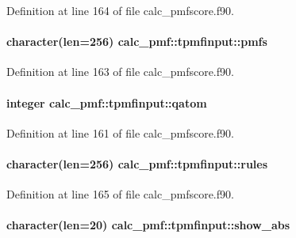 Definition at line 164 of file calc\-\_\-pmfscore.\-f90.

\hypertarget{structcalc__pmf_1_1tpmfinput_a546df7edfc9dfe583c92c0fe3f3e1081}{
\paragraph[{pmfs}]{\setlength{\rightskip}{0pt plus 5cm}character(len=256) calc\-\_\-pmf\-::tpmfinput\-::pmfs}}\label{structcalc__pmf_1_1tpmfinput_a546df7edfc9dfe583c92c0fe3f3e1081}


Definition at line 163 of file calc\-\_\-pmfscore.\-f90.

\hypertarget{structcalc__pmf_1_1tpmfinput_a4ba14d72424ce79ccca496b86afb5c06}{
\paragraph[{qatom}]{\setlength{\rightskip}{0pt plus 5cm}integer calc\-\_\-pmf\-::tpmfinput\-::qatom}}\label{structcalc__pmf_1_1tpmfinput_a4ba14d72424ce79ccca496b86afb5c06}


Definition at line 161 of file calc\-\_\-pmfscore.\-f90.

\hypertarget{structcalc__pmf_1_1tpmfinput_abf2083ff474fedb94c80061cc17aeac9}{
\paragraph[{rules}]{\setlength{\rightskip}{0pt plus 5cm}character(len=256) calc\-\_\-pmf\-::tpmfinput\-::rules}}\label{structcalc__pmf_1_1tpmfinput_abf2083ff474fedb94c80061cc17aeac9}


Definition at line 165 of file calc\-\_\-pmfscore.\-f90.

\hypertarget{structcalc__pmf_1_1tpmfinput_abea97c28c457a9014db464ac2c82e9bd}{
\paragraph[{show\-\_\-abs}]{\setlength{\rightskip}{0pt plus 5cm}character(len=20) calc\-\_\-pmf\-::tpmfinput\-::show\-\_\-abs}}\label{structcalc__pmf_1_1tpmfinput_abea97c28c457a9014db464ac2c82e9bd}


